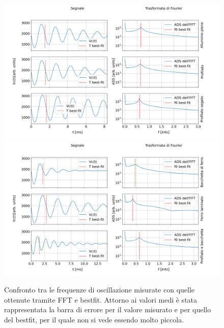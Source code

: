 \documentclass{article}
\begin{document}
        \begin{figure}[H]
            \centering
            \includegraphics[width=\textwidth]{FFT13/FFTMATERIALS1.png}
            \includegraphics[width=\textwidth]{FFT13/FFTMATERIALS2.png}
            \caption{Confronto tra le frequenze di oscillazione misurate con quelle ottenute tramite FFT e bestfit.
            Attorno ai valori medi è stata rappresentata la barra di errore per il valore
            misurato e per quello del bestfit, per il quale non si vede essendo molto piccola.}
            \label{fig:mat_smor}
        \end{figure}
\end{document}
